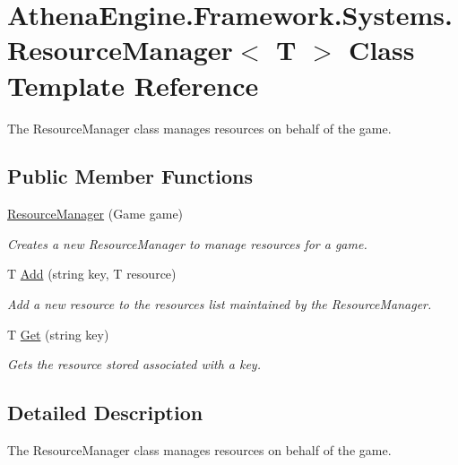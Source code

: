 \hypertarget{class_athena_engine_1_1_framework_1_1_systems_1_1_resource_manager_3_01_t_01_4}{\section{Athena\-Engine.\-Framework.\-Systems.\-Resource\-Manager$<$ T $>$ Class Template Reference}
\label{class_athena_engine_1_1_framework_1_1_systems_1_1_resource_manager_3_01_t_01_4}
}


The Resource\-Manager class manages resources on behalf of the game.  


\subsection*{Public Member Functions}
\begin{DoxyCompactItemize}
\item 
\hyperlink{class_athena_engine_1_1_framework_1_1_systems_1_1_resource_manager_3_01_t_01_4_a9fb0dd52f57d2fe7f5e11b1301834be0}{Resource\-Manager} (Game game)
\begin{DoxyCompactList}\small\item\em Creates a new Resource\-Manager to manage resources for a game. \end{DoxyCompactList}\item 
T \hyperlink{class_athena_engine_1_1_framework_1_1_systems_1_1_resource_manager_3_01_t_01_4_ab14238d641179c601312edb3da71d6c2}{Add} (string key, T resource)
\begin{DoxyCompactList}\small\item\em Add a new resource to the resources list maintained by the Resource\-Manager. \end{DoxyCompactList}\item 
T \hyperlink{class_athena_engine_1_1_framework_1_1_systems_1_1_resource_manager_3_01_t_01_4_ac9cb82fe6115f57d637dc443e9765459}{Get} (string key)
\begin{DoxyCompactList}\small\item\em Gets the resource stored associated with a key. \end{DoxyCompactList}\end{DoxyCompactItemize}


\subsection{Detailed Description}
The Resource\-Manager class manages resources on behalf of the game. 


